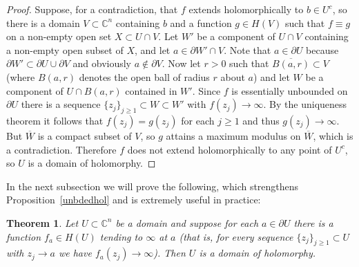 \documentclass[11pt,a4paper, final, twoside]{article}
\newtheorem{theorem}{Theorem}
\numberwithin{equation}{section}
\newcommand{\C}{\mathbb C}
\newcommand{\clos}[1]{\overline{#1}}
\newcommand{\bd}{\partial}
\newcommand{\ball}{B}
\newcommand{\hol}{H}
\begin{document}
\begin{proof}
Suppose, for a contradiction, that $f$ extends holomorphically to $b\in U^c$, so there is a domain $V\subset\C^n$ containing $b$ and a function $g\in H(V)$ such that
$f\equiv g$ on a non-empty open set $X\subset U\cap V$. Let $W'$ be a component of $U\cap V$ containing a non-empty open subset of $X$, and let $a\in \bd W'\cap V$.
Note that $a\in\bd U$ because $\bd W'\subset \bd U\cup\bd V$ and obviously $a\not\in\bd V$.
Now let $r>0$ such that $\clos{\ball(a,r)}\subset V$ (where $\ball(a,r)$ denotes the open ball of radius $r$ about $a$) and let $W$ be a component of $U\cap\ball(a,r)$ contained in $W'$. Since
$f$ is essentially unbounded on $\bd U$ there is a sequence $\{z_j\}_{j\geq 1}\subset W\subset W'$ with $f(z_j)\to\infty$. By the uniqueness theorem it follows that $f(z_j)=g(z_j)$ for each $j\geq 1$ and thus
$g(z_j)\to\infty$. But $\clos{W}$ is a compact subset of $V$,
so $g$ attains a maximum modulus on $\clos{W}$, which is a contradiction. Therefore $f$ does not extend holomorphically to any point of $U^c$, so $U$ is a domain of holomorphy.
\end{proof}
In the next subsection we will prove the following, which strengthens Proposition~\ref{unbdedhol} and is extremely useful in practice:
\begin{theorem}
\label{FML}
Let $U\subset\C^n$ be a domain and suppose for each $a\in\bd U$ there is a function $f_a\in\hol(U)$ tending to $\infty$ at $a$ (that is,
for every sequence $\{z_j\}_{j\geq 1}\subset U$ with $z_j\to a$ we have $f_a(z_j)\to\infty$). Then $U$ is a domain of holomorphy.
\end{theorem}
\end{document}
